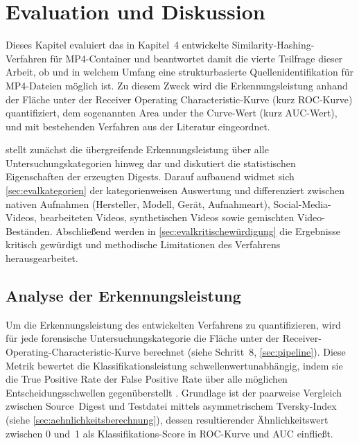 \chapter{Evaluation und Diskussion}
\label{sec:evaluation}

Dieses Kapitel evaluiert das in Kapitel~4 entwickelte Similarity-Hashing-Verfahren für MP4-Container und beantwortet damit die vierte Teilfrage dieser Arbeit, ob und in welchem Umfang eine strukturbasierte Quellenidentifikation für MP4-Dateien möglich ist. Zu diesem Zweck wird die Erkennungsleistung anhand der Fläche unter der Receiver Operating Characteristic-Kurve (kurz ROC-Kurve) quantifiziert, dem sogenannten Area under the Curve-Wert (kurz AUC-Wert), und mit bestehenden Verfahren aus der Literatur eingeordnet.

 stellt zunächst die übergreifende Erkennungsleistung über alle Untersuchungskategorien hinweg dar und diskutiert die statistischen Eigenschaften der erzeugten Digests. Darauf aufbauend widmet sich \cref{sec:evalkategorien} der kategorienweisen Auswertung und differenziert zwischen nativen Aufnahmen (Hersteller, Modell, Gerät, Aufnahmeart), Social-Media-Videos, bearbeiteten Videos, synthetischen Videos sowie gemischten Video-Beständen. Abschließend werden in \cref{sec:evalkritischewürdigung} die Ergebnisse kritisch gewürdigt und methodische Limitationen des Verfahrens herausgearbeitet.


\section{Analyse der Erkennungsleistung}
\label{sec:evalanalyse}

Um die Erkennungsleistung des entwickelten Verfahrens zu quantifizieren, wird für jede forensische Untersuchungskategorie die Fläche unter der Receiver-Operating-Characteristic-Kurve berechnet (siehe Schritt~8, \cref{sec:pipeline}). Diese Metrik bewertet die Klassifikationsleistung schwellenwertunabhängig, indem sie die True Positive Rate der False Positive Rate über alle möglichen Entscheidungsschwellen gegenüberstellt \cite[S.~2825]{pedregosa_scikit-learn_2011}. Grundlage ist der paarweise Vergleich zwischen Source~Digest und Testdatei mittels asymmetrischem Tversky-Index (siehe \cref{sec:aehnlichkeitsberechnung}), dessen resultierender Ähnlichkeitswert zwischen 0 und~1 als Klassifikations-Score in ROC-Kurve und AUC einfließt.

